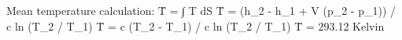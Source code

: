 Mean temperature calculation:  
T̄ = ∫ T dS  
T̄ = (h_2 - h_1 + V (p_2 - p_1)) / c ln (T_2 / T_1)  
T̄ = c (T_2 - T_1) / c ln (T_2 / T_1)  
T̄ = 293.12 Kelvin
